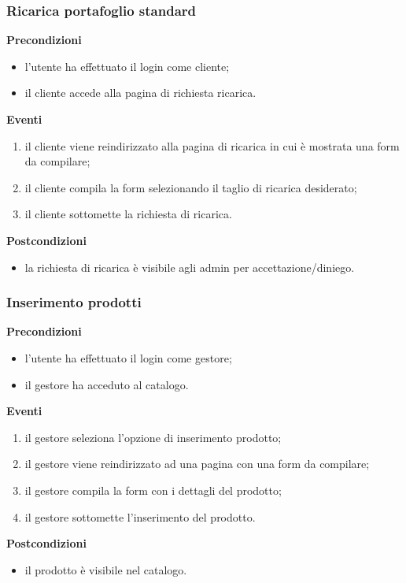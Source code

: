 \documentclass[a4paper, 14pt]{article}
\begin{document}
\begin{flushleft}
			\bigskip
			\subsubsection{Ricarica portafoglio standard}
			\textbf{Precondizioni}
			\begin{itemize}
				\item l'utente ha effettuato il login come cliente;
				\item il cliente accede alla pagina di richiesta ricarica.
			\end{itemize}
			\textbf{Eventi}
			\begin{enumerate}
				\item il cliente viene reindirizzato alla pagina di ricarica in cui è mostrata una form da compilare;
				\item il cliente compila la form selezionando il taglio di ricarica desiderato;
				\item il cliente sottomette la richiesta di ricarica.
			\end{enumerate}
			\textbf{Postcondizioni}
			\begin{itemize}
				\item la richiesta di ricarica è visibile agli admin per accettazione/diniego.
			\end{itemize}
		
			\bigskip
			\subsubsection{Inserimento prodotti}
			\textbf{Precondizioni}
			\begin{itemize}
				\item l'utente ha effettuato il login come gestore;
				\item il gestore ha acceduto al catalogo.
			\end{itemize}
			\textbf{Eventi}
			\begin{enumerate}
				\item il gestore seleziona l'opzione di inserimento prodotto;
				\item il gestore viene reindirizzato ad una pagina con una form da compilare;
				\item il gestore compila la form con i dettagli del prodotto;
				\item il gestore sottomette l'inserimento del prodotto.
			\end{enumerate}
			\textbf{Postcondizioni}
			\begin{itemize}
				\item il prodotto è visibile nel catalogo.
			\end{itemize}
			

\end{flushleft}
\end{document}
